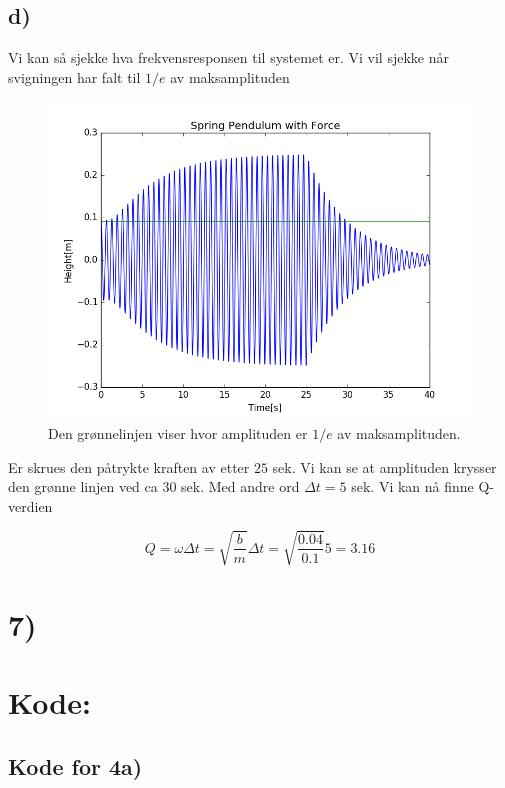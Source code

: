 \documentclass[a4paper,norsk, 10pt]{article}
\begin{document}
\subsection*{d)}
Vi kan så sjekke hva frekvensresponsen til systemet er. Vi vil sjekke når svigningen har falt til $1/e$ av maksamplituden

\begin{figure}[H]
\centering
\includegraphics[scale=0.4]{oneOverEFall.png}
\caption{Den grønnelinjen viser hvor amplituden er $1/e$ av maksamplituden.}
\end{figure}

Er skrues den påtrykte kraften av etter $25$ sek. Vi kan se at amplituden krysser den grønne linjen ved ca $30$ sek. Med andre ord $\Delta t = 5$ sek. Vi kan nå finne Q-verdien

$$
Q = \omega \Delta t = \sqrt{\frac{b}{m}}\Delta t = \sqrt{\frac{0.04}{0.1}}5 = 3.16
$$

\section*{7)}



\section*{Kode:}

\subsection*{Kode for 4a)}



\end{document}
